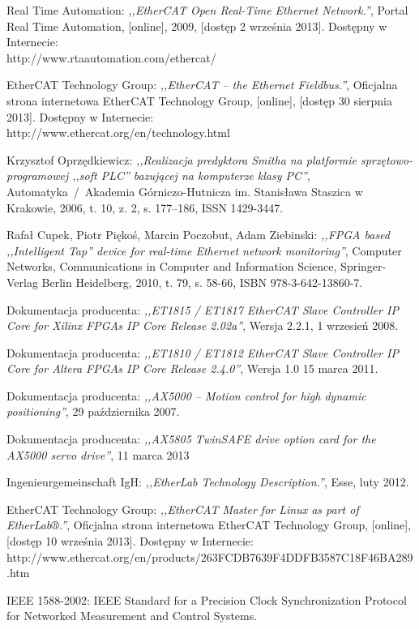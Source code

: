 \begin{thebibliography}{99}
Real Time Automation:
\emph{,,EtherCAT Open Real-Time Ethernet Network.''},
Portal Real Time Automation, 
[online],
2009,
[dostęp 2 września 2013].
Dostępny w Internecie: \\
http://www.rtaautomation.com/ethercat/

EtherCAT Technology Group:
\emph{,,EtherCAT -- the Ethernet Fieldbus.''},
Oficjalna strona internetowa EtherCAT Technology Group,
[online],
[dostęp 30 sierpnia 2013].
Dostępny w Internecie: \\
http://www.ethercat.org/en/technology.html

Krzysztof Oprzędkiewicz:
\emph{,,Realizacja predyktora Smitha na platformie sprzętowo-programowej ,,soft PLC'' bazującej na komputerze klasy PC''},
Automatyka~/~Akademia Górniczo-Hutnicza im. Stanisława Staszica w Krakowie,
2006,
t. 10, z. 2, s. 177--186,
ISSN 1429-3447.

Rafał Cupek, Piotr Piękoś, Marcin Poczobut, Adam Ziebinski:
\emph{,,FPGA based ,,Intelligent Tap'' device for real-time Ethernet network monitoring''},
Computer Networks, Communications in Computer and Information Science, Springer-Verlag Berlin Heidelberg,
2010,
t. 79, s. 58-66,
ISBN 978-3-642-13860-7.

Dokumentacja producenta: 
\emph{,,ET1815 / ET1817 EtherCAT Slave Controller IP Core for Xilinx FPGAs IP Core Release 2.02a''}, 
Wersja 2.2.1,
1 wrzesień 2008.

Dokumentacja producenta: 
\emph{,,ET1810 / ET1812 EtherCAT Slave Controller IP Core for Altera FPGAs IP Core Release 2.4.0''}, 
Wersja 1.0
15 marca 2011.

Dokumentacja producenta: 
\emph{,,AX5000 – Motion control for high dynamic positioning''},
29 października 2007.

Dokumentacja producenta: 
\emph{,,AX5805 TwinSAFE drive option card for the AX5000 servo drive''},
11 marca 2013

Ingenieurgemeinschaft IgH:
\emph{,,EtherLab Technology Description.''},
Esse,
luty 2012.

EtherCAT Technology Group:
\emph{,,EtherCAT Master for Linux as part of EtherLab®.''},
Oficjalna strona internetowa EtherCAT Technology Group,
[online],
[dostęp 10 września 2013].
Dostępny w Internecie: \\
http://www.ethercat.org/en/products/263FCDB7639F4DDFB3587C18F46BA289.htm

IEEE 1588-2002: IEEE Standard for a Precision Clock Synchronization Protocol for Networked Measurement and Control Systems.


\end{thebibliography}